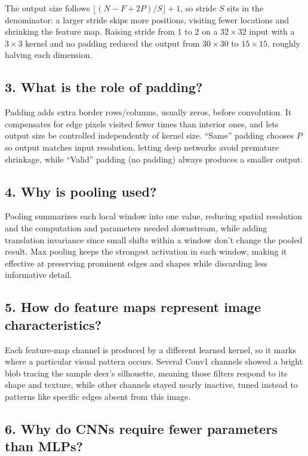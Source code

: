 \documentclass[11pt,a4paper]{article}
\begin{document}
The output size follows $\lfloor(N-F+2P)/S\rfloor+1$, so stride $S$ sits in the denominator: a larger stride skips more positions, visiting fewer locations and shrinking the feature map. Raising stride from 1 to 2 on a $32\times32$ input with a $3\times3$ kernel and no padding reduced the output from $30\times30$ to $15\times15$, roughly halving each dimension.
 
\subsection*{3. What is the role of padding?}
 
Padding adds extra border rows/columns, usually zeros, before convolution. It compensates for edge pixels visited fewer times than interior ones, and lets output size be controlled independently of kernel size. ``Same'' padding chooses $P$ so output matches input resolution, letting deep networks avoid premature shrinkage, while ``Valid'' padding (no padding) always produces a smaller output.
 
\subsection*{4. Why is pooling used?}
 
Pooling summarizes each local window into one value, reducing spatial resolution and the computation and parameters needed downstream, while adding translation invariance since small shifts within a window don't change the pooled result. Max pooling keeps the strongest activation in each window, making it effective at preserving prominent edges and shapes while discarding less informative detail.
 
\subsection*{5. How do feature maps represent image characteristics?}
 
Each feature-map channel is produced by a different learned kernel, so it marks where a particular visual pattern occurs. Several Conv1 channels showed a bright blob tracing the sample deer's silhouette, meaning those filters respond to its shape and texture, while other channels stayed nearly inactive, tuned instead to patterns like specific edges absent from this image.
 
\subsection*{6. Why do CNNs require fewer parameters than MLPs?}
 
\end{document}
